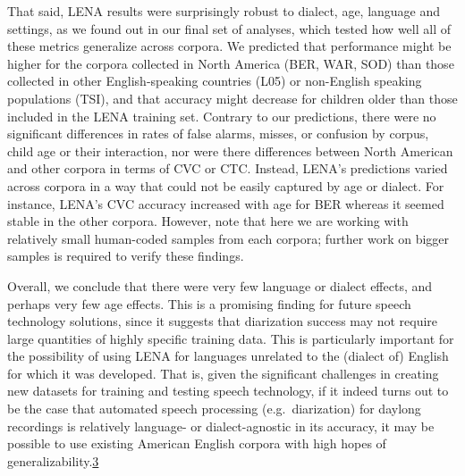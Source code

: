 \documentclass[english,floatsintext,man]{apa6}
\begin{document}
That said, LENA results were surprisingly robust to dialect, age,
language and settings, as we found out in our final set of analyses,
which tested how well all of these metrics generalize across corpora. We
predicted that performance might be higher for the corpora collected in
North America (BER, WAR, SOD) than those collected in other
English-speaking countries (L05) or non-English speaking populations
(TSI), and that accuracy might decrease for children older than those
included in the LENA training set. Contrary to our predictions, there
were no significant differences in rates of false alarms, misses, or
confusion by corpus, child age or their interaction, nor were there
differences between North American and other corpora in terms of CVC or
CTC. Instead, LENA's predictions varied across corpora in a way that
could not be easily captured by age or dialect. For instance, LENA's CVC
accuracy increased with age for BER whereas it seemed stable in the
other corpora. However, note that here we are working with relatively
small human-coded samples from each corpora; further work on bigger
samples is required to verify these findings.

Overall, we conclude that there were very few language or dialect
effects, and perhaps very few age effects. This is a promising finding
for future speech technology solutions, since it suggests that
diarization success may not require large quantities of highly specific
training data. This is particularly important for the possibility of
using LENA for languages unrelated to the (dialect of) English for which
it was developed. That is, given the significant challenges in creating
new datasets for training and testing speech technology, if it indeed
turns out to be the case that automated speech processing
(e.g.~diarization) for daylong recordings is relatively language- or
dialect-agnostic in its accuracy, it may be possible to use existing
American English corpora with high hopes of
generalizability.\href{To\%20be\%20clear,\%20given\%20that\%20we\%20were\%20unable\%20to\%20computer\%20AWC\%20for\%20Tsimane',\%20we\%20are\%20only\%20able\%20to\%20speak\%20to\%20generalizability\%20across\%20samples\%20and\%20dialects\%20of\%20English\%20for\%20that\%20metric}{3}
\end{document}

